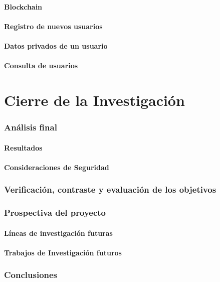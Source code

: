     \subsection{Blockchain}
    \subsection{Registro de nuevos usuarios}
    \subsection{Datos privados de un usuario}
    \subsection{Consulta de usuarios}
    \part{Cierre de la Investigación}
    \section{Análisis final}
    \subsection{Resultados}
    \subsection{Consideraciones de Seguridad}
    \section{Verificación, contraste y evaluación de los objetivos}
    \section{Prospectiva del proyecto }
    \subsection{Líneas de investigación futuras}
    \subsection{Trabajos de Investigación futuros}
    \section{Conclusiones}